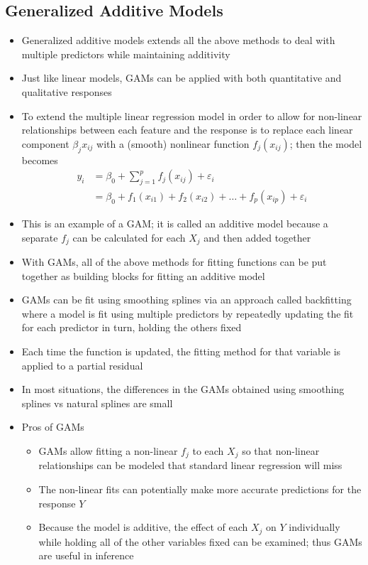 \documentclass[12pt]{article}
\begin{document}
\subsection{Generalized Additive Models}
\begin{itemize} 
\item Generalized additive models extends all the above methods to deal with multiple predictors while maintaining additivity
\item Just like linear models, GAMs can be applied with both quantitative and qualitative responses 
\item To extend the multiple linear regression model in order to allow for non-linear relationships between each feature and the response is to replace each linear component $\beta_jx_{ij}$ with a (smooth) nonlinear function $f_j(x_{ij})$; then the model becomes $$ \begin{aligned} y_i &= \beta_0 + \sum_{j=1}^p f_j(x_{ij}) + \varepsilon_i \\ &= \beta_0 + f_1(x_{i1}) + f_2(x_{i2}) + \dots + f_p(x_{ip}) + \varepsilon_i \end{aligned} $$ 
\item This is an example of a GAM; it is called an additive model because a separate $f_j$ can be calculated for each $X_j$ and then added together 
\item With GAMs, all of the above methods for fitting functions can be put together as building blocks for fitting an additive model
\item GAMs can be fit using smoothing splines via an approach called backfitting where a model is fit using multiple predictors by repeatedly updating the fit for each predictor in turn, holding the others fixed 
\item Each time the function is updated, the fitting method for that variable is applied to a partial residual 
\item In most situations, the differences in the GAMs obtained using smoothing splines vs natural splines are small
\item Pros of GAMs \begin{itemize} 
\item GAMs allow fitting a non-linear $f_j$ to each $X_j$ so that non-linear relationships can be modeled that standard linear regression will miss 
\item The non-linear fits can potentially make more accurate predictions for the response $Y$ 
\item Because the model is additive, the effect of each $X_j$ on $Y$ individually while holding all of the other variables fixed can be examined; thus GAMs are useful in inference

\end{itemize}
\end{itemize}
\end{document}

